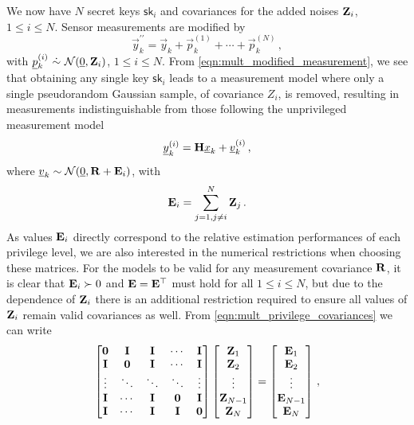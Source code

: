 \documentclass[letterpaper, 10 pt, conference]{IEEEtran}
\theoremstyle{definition}
\begin{document}
We now have $N$ secret keys $\mathsf{sk}_i$ and covariances for the added noises ${{\mathbf{Z}}}_i$, $1\leq i \leq N$. Sensor measurements are modified by
\begin{equation}\label{eqn:mult_modified_measurement}
   \vec{y}_k^{\prime\prime} = \vec{y}_k + \vec{p}^{(1)}_k + \cdots + \vec{p}^{(N)}_k\,,
\end{equation}
with $\vec{p}^{(i)}_k\ \dot{\sim}\ \mathcal{N}(\vec{0}, \mat{Z}_i)$, $1\leq i \leq N$. From \eqref{eqn:mult_modified_measurement}, we see that obtaining any single key $\mathsf{sk}_i$ leads to a measurement model where only a single pseudorandom Gaussian sample, of covariance $Z_i$, is removed, resulting in measurements indistinguishable from those following the unprivileged measurement model
\begin{equation}
   {\underline{y}}_k^{(i)} = {{\mathbf{H}}}{\underline{x}}_k + {\underline{v}}^{(i)}_k\,,
\end{equation}
where ${\underline{v}}_k\sim \mathcal{N}({\underline{0}},{{\mathbf{R}}}+{{\mathbf{E}}}_i)$, with
\begin{equation}\label{eqn:mult_privilege_covariances}
   \mat{E}_i = \sum^N_{j=1,j \neq i}\mat{Z}_j\,.
\end{equation}
As values ${{\mathbf{E}}}_i$ directly correspond to the relative estimation performances of each privilege level, we are also interested in the numerical restrictions when choosing these matrices. For the models to be valid for any measurement covariance ${{\mathbf{R}}}$, it is clear that ${{\mathbf{E}}}_i\succ 0$ and ${{\mathbf{E}}}={{\mathbf{E}}}^\top$ must hold for all $1\leq i\leq N$, but due to the dependence of ${{\mathbf{Z}}}_i$ there is an additional restriction required to ensure all values of ${{\mathbf{Z}}}_i$ remain valid covariances as well. From \eqref{eqn:mult_privilege_covariances} we can write
\begin{equation}
   \begin{bmatrix}
      {\ensuremath{{\mathbf{0}}}} & {{\mathbf{I}}} & {{\mathbf{I}}} & \cdots & {{\mathbf{I}}}\\
      {{\mathbf{I}}} & {{\mathbf{0}}} & {{\mathbf{I}}} & \cdots & {{\mathbf{I}}}\\
      \vdots & \ddots & \ddots & \ddots & \vdots\\
      {{\mathbf{I}}} & \cdots & {{\mathbf{I}}} & {{\mathbf{0}}} & {{\mathbf{I}}}\\
      {{\mathbf{I}}} & \cdots & {{\mathbf{I}}} & {{\mathbf{I}}} & {{\mathbf{0}}}
   \end{bmatrix}
   \begin{bmatrix}
      {\ensuremath{{\mathbf{Z}}}}_1\\
      {{\mathbf{Z}}}_2\\
      \vdots\\
      {{\mathbf{Z}}}_{N-1}\\
      {{\mathbf{Z}}}_N
   \end{bmatrix}
   =
   \begin{bmatrix}
      {\ensuremath{{\mathbf{E}}}}_1\\
      {{\mathbf{E}}}_2\\
      \vdots\\
      {{\mathbf{E}}}_{N-1}\\
      {{\mathbf{E}}}_N
   \end{bmatrix}\,,
\end{equation}
\end{document}
